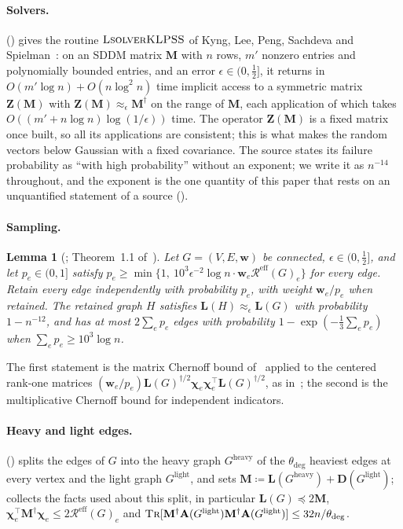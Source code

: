 \documentclass[11pt]{article}
\newtheorem{lemma}[theorem]{Lemma}
\theoremstyle{remark}
\renewcommand{\AA}{\mathbf A}
\newcommand{\cchi}{{\boldsymbol\chi}}
\newcommand{\DD}{\mathbf D}
\newcommand{\LL}{\mathbf L}
\newcommand{\MM}{\mathbf M}
\newcommand{\ww}{\mathbf w}
\newcommand{\ZZ}{\mathbf Z}
\newcommand{\dheavy}{\theta_{\deg}}
\newcommand{\Gh}{G^{\mathrm{heavy}}}
\newcommand{\Gl}{G^{\mathrm{light}}}
\newcommand{\Rcal}{\mathcal{R}}
\newcommand{\Reff}{\Rcal^{\mathrm{eff}}}
\newcommand{\defeq}{\coloneqq}
\newcommand{\tr}{\textsc{Tr}}
\begin{document}
\paragraph{Solvers.}
 () gives the routine
$\textsc{LsolverKLPSS}$ of Kyng, Lee, Peng, Sachdeva and
Spielman~\cite{KLPSS16:conf}: on an SDDM matrix $\MM$ with $n$ rows, $m'$
nonzero entries and polynomially bounded entries, and an error
$\epsilon\in(0,\frac12]$, it returns in $O(m'\log n)+O(n\log^{2}n)$ time
implicit access to a symmetric matrix $\ZZ(\MM)$ with
$\ZZ(\MM)\approx_{\epsilon}\MM^{\dag}$ on the range of $\MM$, each
application of which takes $O((m'+n\log n)\log(1/\epsilon))$ time.
The operator $\ZZ(\MM)$ is a fixed matrix once built, so all its applications
are consistent; this is what makes the random vectors below Gaussian with a
fixed covariance.
The source states its failure probability as ``with high probability''
without an exponent; we write it as $n^{-14}$ throughout, and the
exponent is the one quantity of this paper that rests on an unquantified
statement of a source ().

\paragraph{Sampling.}
\begin{lemma}[\cite{SS11:journal}; Theorem~1.1 of~\cite{T12:journal}]\label{lem:sparsify}
Let $G=(V,E,\ww)$ be connected, $\epsilon\in(0,\frac12]$, and let
$p_e\in(0,1]$ satisfy $p_e\ge\min\{1,\ 10^{3}\epsilon^{-2}\log n\cdot\ww_e\Reff(G)_e\}$
for every edge.
Retain every edge independently with probability $p_e$, with weight
$\ww_e/p_e$ when retained.
The retained graph $H$ satisfies $\LL(H)\approx_{\epsilon}\LL(G)$ with
probability $1-n^{-12}$, and has at most $2\sum_ep_e$ edges with probability
$1-\exp(-\frac13\sum_ep_e)$ when $\sum_ep_e\ge10^{3}\log n$.
\end{lemma}
The first statement is the matrix Chernoff bound of~\cite{T12:journal}
applied to the centered rank-one matrices
$(\ww_e/p_e)\LL(G)^{\dag/2}\cchi_e\cchi_e^{\top}\LL(G)^{\dag/2}$, as in~\cite{SS11:journal};
the second is the multiplicative Chernoff bound for independent indicators.

\paragraph{Heavy and light edges.}
 () splits the edges of $G$ into the
heavy graph $\Gh$ of the $\dheavy$ heaviest edges at every vertex and the
light graph $\Gl$, and sets $\MM\defeq\LL(\Gh)+\DD(\Gl)$; 
collects the facts used about this split, in particular $\LL(G)\preceq2\MM$,
$\cchi_e^{\top}\MM^{\dag}\cchi_e\le2\Reff(G)_e$ and
$\tr[\MM^{\dag}\AA(\Gl)\MM^{\dag}\AA(\Gl)]\le32n/\dheavy$.
\end{document}
